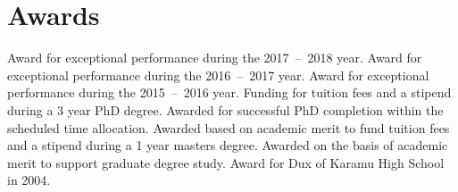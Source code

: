 \documentclass[print]{cv-style}
\begin{document}

\section{Awards}
\begin{entrylist}
{Award for exceptional performance during the 2017~--~2018 year.}
{Award for exceptional performance during the 2016~--~2017 year.}
{Award for exceptional performance during the 2015~--~2016 year.}
{Funding for tuition fees and a stipend during a 3 year PhD degree.}
{Awarded for successful PhD completion within the scheduled time allocation.}
{Awarded based on academic merit to fund tuition fees and a stipend during a 1 year masters degree.}
{Awarded on the basis of academic merit to support graduate degree study.}
\vspace{-3mm}
\vspace{-3mm}
{Award for Dux of Karamu High School in 2004.}
\end{entrylist}


\pagebreak
\end{document}
